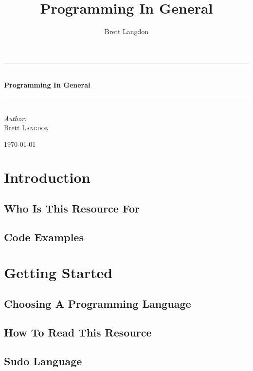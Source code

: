 \documentclass[10pt,a4paper,titlepage]{book}
\author{Brett Langdon}
\title{Programming In General}
\newcommand{\HRule}{\rule{\linewidth}{0.5mm}}
\begin{document}
\begin{titlepage}
\begin{center}

\vspace*{3 in}

\HRule \\[0.4cm]
{\huge \bfseries Programming In General}
\HRule \\[0.4cm]

\emph{Author:}\\
Brett \textsc{Langdon}

\vfill

{\large \today}

\end{center}
\end{titlepage}

\tableofcontents

\chapter{Introduction}

\vfill
\pagebreak
\section{Who Is This Resource For}


\section{Code Examples}


\chapter{Getting Started}

\vfill
\pagebreak
\section{Choosing A Programming Language}


\section{How To Read This Resource}


\section{Sudo Language}

\end{document}
